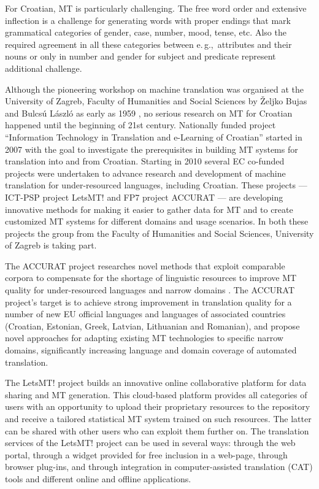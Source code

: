 \begin{multicols}{2}
For Croatian, MT is particularly challenging. The free word order and extensive inflection is a challenge for generating words with proper endings that mark grammatical categories of gender, case, number, mood, tense, etc. Also the required agreement in all these categories between e.\,g.,~attributes and their nouns or only in number and gender for subject and predicate represent additional challenge.

Although the pioneering workshop on machine translation was organised at the University of Zagreb, Faculty of Humanities and Social Sciences by Željko Bujas and Bulcsú László as early as 1959 \cite{art4}, no serious research on MT for Croatian happened until the beginning of 21st century. Nationally funded project “Information Technology in Translation and e-Learning of Croatian” \cite{str22} started in 2007 with the goal to investigate the prerequisites in building MT systems for translation into and from Croatian. Starting in 2010 several EC co-funded projects were undertaken to advance research and development of machine translation for under-resourced languages, including Croatian. These projects — ICT-PSP project LetsMT! \cite{str23} and FP7 project ACCURAT \cite{str24} — are developing innovative methods for making it easier to gather data for MT and to create customized MT systems for different domains and usage scenarios. In both these projects the group from the Faculty of Humanities and Social Sciences, University of Zagreb is taking part.

The ACCURAT project \cite{pro3} researches novel methods that exploit comparable corpora to compensate for the shortage of linguistic resources to improve MT quality for under-resourced languages and narrow domains \cite{pro4}. The ACCURAT project’s target is to achieve strong improvement in translation quality for a number of new EU official languages and languages of associated countries (Croatian, Estonian, Greek, Latvian, Lithuanian and Romanian), and propose novel approaches for adapting existing MT technologies to specific narrow domains, significantly increasing language and domain coverage of automated translation.

The LetsMT! project \cite{pro5} builds an innovative online collaborative platform for data sharing and MT generation. This cloud-based platform provides all categories of users with an opportunity to upload their proprietary resources to the repository and receive a tailored statistical MT system trained on such resources. The latter can be shared with other users who can exploit them further on. The translation services of the LetsMT! project can be used in several ways: through the web portal, through a widget provided for free inclusion in a web-page, through browser plug-ins, and through integration in computer-assisted translation (CAT) tools and different online and offline applications.


\end{multicols}
